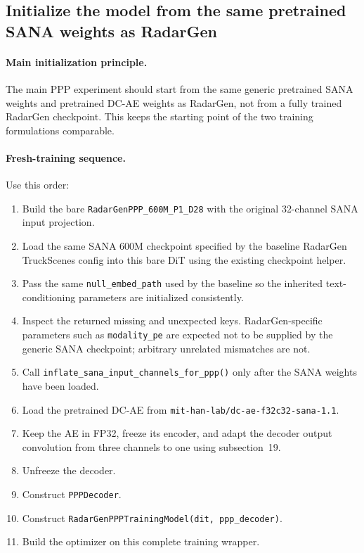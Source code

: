 \documentclass[11pt,a4paper]{article}
\begin{document}
\subsection{Initialize the model from the same pretrained SANA weights as RadarGen}

\paragraph{Main initialization principle.}
The main PPP experiment should start from the same generic pretrained SANA weights and pretrained DC-AE weights as RadarGen, not from a fully trained RadarGen checkpoint. This keeps the starting point of the two training formulations comparable.

\paragraph{Fresh-training sequence.}
Use this order:
\begin{enumerate}[label=\arabic*.]
    \item Build the bare \texttt{RadarGenPPP\_600M\_P1\_D28} with the original 32-channel SANA input projection.
    \item Load the same SANA 600M checkpoint specified by the baseline RadarGen TruckScenes config into this bare DiT using the existing checkpoint helper.
    \item Pass the same \texttt{null\_embed\_path} used by the baseline so the inherited text-conditioning parameters are initialized consistently.
    \item Inspect the returned missing and unexpected keys. RadarGen-specific parameters such as \texttt{modality\_pe} are expected not to be supplied by the generic SANA checkpoint; arbitrary unrelated mismatches are not.
    \item Call \texttt{inflate\_sana\_input\_channels\_for\_ppp()} only after the SANA weights have been loaded.
    \item Load the pretrained DC-AE from \texttt{mit-han-lab/dc-ae-f32c32-sana-1.1}.
    \item Keep the AE in FP32, freeze its encoder, and adapt the decoder output convolution from three channels to one using subsection~19.
    \item Unfreeze the decoder.
    \item Construct \texttt{PPPDecoder}.
    \item Construct \texttt{RadarGenPPPTrainingModel(dit, ppp\_decoder)}.
    \item Build the optimizer on this complete training wrapper.
\end{enumerate}
\end{document}
